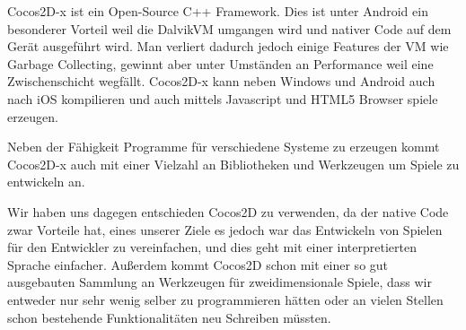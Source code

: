 Cocos2D-x ist ein Open-Source C++ Framework. Dies ist unter Android ein besonderer Vorteil weil die DalvikVM umgangen wird und nativer Code auf dem Gerät ausgeführt wird.
Man verliert dadurch jedoch einige Features der VM wie Garbage Collecting, gewinnt aber unter Umständen an Performance weil eine Zwischenschicht wegfällt.
Cocos2D-x kann neben Windows und Android auch nach iOS kompilieren und auch mittels Javascript und HTML5 Browser spiele erzeugen.

Neben der Fähigkeit Programme für verschiedene Systeme zu erzeugen kommt Cocos2D-x auch mit einer Vielzahl an Bibliotheken und Werkzeugen um Spiele zu entwickeln an.

Wir haben uns dagegen entschieden Cocos2D zu verwenden, da der native Code zwar Vorteile hat, eines unserer Ziele es jedoch war das Entwickeln von Spielen für den Entwickler zu vereinfachen, und dies geht mit einer interpretierten Sprache einfacher. Außerdem kommt Cocos2D schon mit einer so gut ausgebauten Sammlung an Werkzeugen für zweidimensionale Spiele, dass wir entweder nur sehr wenig selber zu programmieren hätten oder an vielen Stellen schon bestehende Funktionalitäten neu Schreiben müssten.